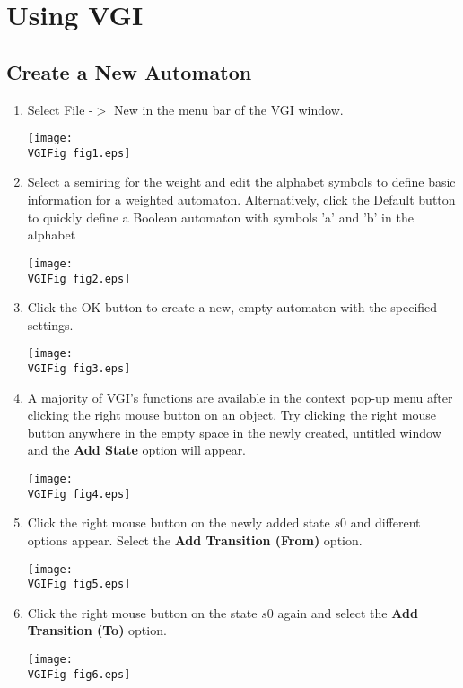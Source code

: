 \section{Using VGI}

\subsection{Create a New Automaton}

\begin{enumerate}
\item   Select File -$>$ New in the menu bar of the VGI window.
\begin{center}
\texttt{[image: \\VGIFig fig1.eps]}
\end{center}

\item   Select a semiring for the weight and edit the alphabet symbols
to define basic information for a weighted automaton.
Alternatively, click the Default button to quickly define a
Boolean automaton with symbols 'a' and 'b' in the alphabet
\begin{center}
\texttt{[image: \\VGIFig fig2.eps]}
\end{center}

\item   Click the OK button to create a new, empty automaton with the specified settings.
\begin{center}
\texttt{[image: \\VGIFig fig3.eps]}
\end{center}

\item A majority of VGI's functions are available in the context pop-up menu
after clicking the right mouse button on an object.  Try clicking the right mouse button
anywhere in the empty space in the newly created, untitled window
and the {\bf Add State} option will appear.
\begin{center}
\texttt{[image: \\VGIFig fig4.eps]}
\end{center}

\item  Click the right mouse button on the newly added state
$s0$ and different options appear.  Select the {\bf Add Transition
(From)} option.
\begin{center}
\texttt{[image: \\VGIFig fig5.eps]}
\end{center}

\item  Click the right mouse button on the state $s0$ again and select
the {\bf Add Transition (To)} option.
\begin{center}
\texttt{[image: \\VGIFig fig6.eps]}
\end{center}


\end{enumerate}
